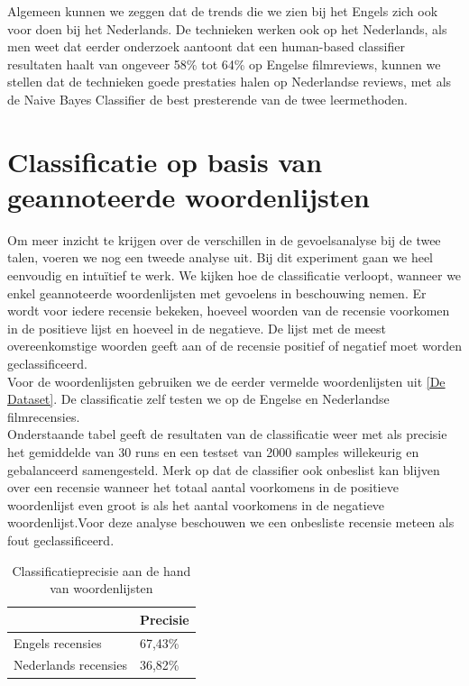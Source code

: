 Algemeen kunnen we zeggen dat de trends die we zien bij het Engels zich ook voor doen bij het Nederlands. De technieken werken ook op het Nederlands, als men weet dat eerder onderzoek \cite{pang2002thumbs} aantoont dat een human-based classifier resultaten haalt van ongeveer 58\% tot 64\% op Engelse filmreviews, kunnen we stellen dat de technieken goede prestaties halen op Nederlandse reviews, met als de Naive Bayes Classifier de best presterende van de twee leermethoden.


\section{Classificatie op basis van geannoteerde woordenlijsten}\label{Classificatie op basis van geannoteerde woordenlijsten}

Om meer inzicht te krijgen over de verschillen in de gevoelsanalyse bij de twee talen, voeren we nog een tweede analyse uit. Bij dit experiment gaan we heel eenvoudig en intu\"itief te werk. We kijken hoe de classificatie verloopt, wanneer we enkel geannoteerde woordenlijsten met gevoelens in beschouwing nemen. Er wordt voor iedere recensie bekeken, hoeveel woorden van de recensie voorkomen in de positieve lijst en hoeveel in de negatieve. De lijst met de meest overeenkomstige woorden geeft aan of de recensie positief of negatief moet worden geclassificeerd.\\
Voor de woordenlijsten gebruiken we de eerder vermelde woordenlijsten uit \ref{De Dataset}. De classificatie zelf testen we op de Engelse en Nederlandse filmrecensies.\\
Onderstaande tabel geeft de resultaten van de classificatie weer met als precisie het gemiddelde van 30 runs en een testset van 2000 samples willekeurig en gebalanceerd samengesteld. Merk op dat de classifier ook onbeslist kan blijven over een recensie wanneer het totaal aantal voorkomens in de positieve woordenlijst even groot is als het aantal voorkomens in de negatieve woordenlijst.Voor deze analyse beschouwen we een onbesliste recensie meteen als fout geclassificeerd.

\begin{table}[H]
\centering
\begin{tabular}{l|l|}
\cline{2-2}
                                           & Precisie \\ \hline
\multicolumn{1}{|l|}{Engels recensies}     & 67,43\%  \\ \hline
\multicolumn{1}{|l|}{Nederlands recensies} & 36,82\%   \\ \hline
\end{tabular}
\caption{Classificatieprecisie aan de hand van woordenlijsten}
\end{table}

